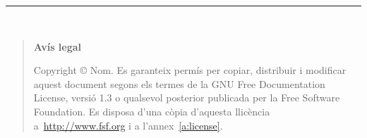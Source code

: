 
\newlength{\centeroffset}
\setlength{\centeroffset}{-0.5\oddsidemargin}
\addtolength{\centeroffset}{0.5\evensidemargin}
\thispagestyle{empty}
\noindent\hspace*{\centeroffset}

\begin{minipage}{\textwidth}
\vspace*{3truecm}


\noindent\rule[-1ex]{\textwidth}{5pt}\\[4.5ex]
\end{minipage}


\noindent\hspace*{\centeroffset}
\begin{minipage}{\textwidth}
\addtolength{\textwidth}{\centeroffset}
\end{minipage}


\pagebreak

\vspace*{16truecm}

	\begin{quote}
	\textbf{Avís legal}

	  Copyright \copyright{}  Nom.
	  Es garanteix permís per copiar, distribuir i modificar aquest document segons els termes de la GNU Free Documentation License, versió 1.3 o qualsevol posterior publicada per la Free Software Foundation. Es disposa d'una còpia d'aquesta llicència a~\href{http://www.fsf.org}{http://www.fsf.org} i a l'annex~\ref{a:license}.
	\end{quote}	





\endinput
